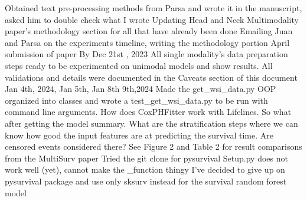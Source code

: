 \documentclass{article}%
\begin{document}
\newline%
\newline%
%
Obtained text pre{-}processing methods from Parsa and wrote it in the manuscript, asked him to double check what I wrote %
\newline%
\newline%
%
Updating Head and Neck Multimodality paper’s methodology section for all that have already been done%
\newline%
\newline%
%
Emailing Juan and Parsa on the experiments timeline, writing the methodology portion%
\newline%
\newline%
%
April submission of paper %
\newline%
\newline%
%
By Dec 21st , 2023 %
\newline%
\newline%
%
All single modality’s data preparation steps ready to be experimented on unimodal models and show results. All validations and details were documented in the Caveats section of this document %
\newline%
\newline%
%
Jan 4th, 2024, Jan 5th, Jan 8th 9th,2024%
\newline%
\newline%
%
Made the get\_wsi\_data.py OOP organized into classes and wrote a test\_get\_wsi\_data.py to be run with command line arguments.%
\newline%
\newline%
%
How does CoxPHFitter work with Lifelines. So what after getting the model summary. What are the stratification steps where we can know how good the input features are at predicting the survival time. Are censored events considered there? %
\newline%
\newline%
%
See Figure 2 and Table 2 for result comparisons from the MultiSurv paper %
\newline%
\newline%
%
Tried the git clone for pysurvival%
\newline%
\newline%
%
Setup.py does not work well (yet), cannot make the \_function thingy%
\newline%
\newline%
%
I’ve decided to give up on pysurvival package and use only sksurv instead for the survival random forest model %
\newline%
\end{document}
